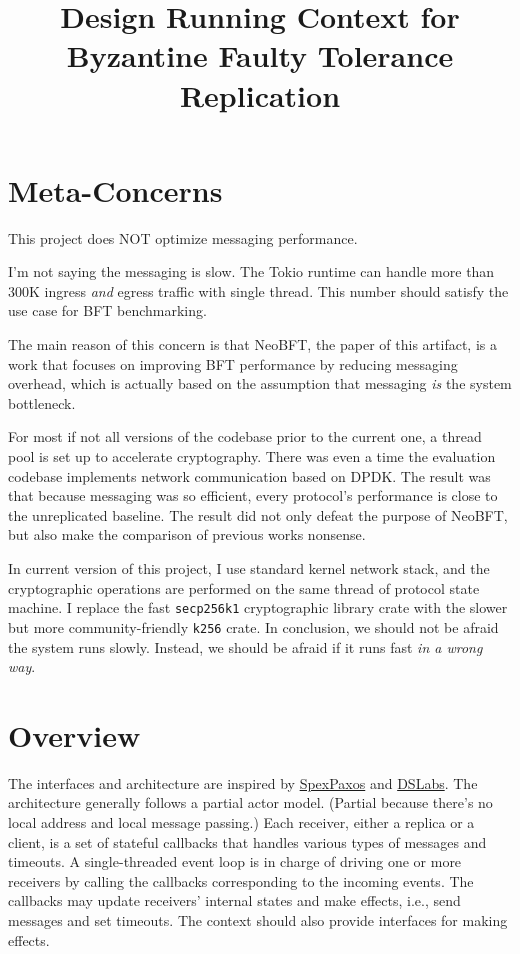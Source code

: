 \documentclass[acmsmall, nonacm, screen]{acmart}
\title{Design Running Context for Byzantine Faulty Tolerance Replication}
\begin{document}
\maketitle

\section{Meta-Concerns}

This project does NOT optimize messaging performance.

I'm not saying the messaging is slow.
The Tokio runtime can handle more than 300K ingress \emph{and} egress traffic with single thread.
This number should satisfy the use case for BFT benchmarking.

The main reason of this concern is that NeoBFT, the paper of this artifact, is a work that focuses on improving BFT performance by reducing messaging overhead, which is actually based on the assumption that messaging \emph{is} the system bottleneck.

For most if not all versions of the codebase prior to the current one, a thread pool is set up to accelerate cryptography.
There was even a time the evaluation codebase implements network communication based on DPDK.
The result was that because messaging was so efficient, every protocol's performance is close to the unreplicated baseline.
The result did not only defeat the purpose of NeoBFT, but also make the comparison of previous works nonsense.

In current version of this project, I use standard kernel network stack, and the cryptographic operations are performed on the same thread of protocol state machine.
I replace the fast \texttt{secp256k1} cryptographic library crate with the slower but more community-friendly \texttt{k256} crate.
In conclusion, we should not be afraid the system runs slowly.
Instead, we should be afraid if it runs fast \emph{in a wrong way}.

\section{Overview}

The interfaces and architecture are inspired by \href{https://github.com/UWSysLab/specpaxos}{SpexPaxos} and \href{https://github.com/emichael/dslabs}{DSLabs}.
The architecture generally follows a partial actor model.
(Partial because there's no local address and local message passing.)
Each receiver, either a replica or a client, is a set of stateful callbacks that handles various types of messages and timeouts.
A single-threaded event loop is in charge of driving one or more receivers by calling the callbacks corresponding to the incoming events.
The callbacks may update receivers' internal states and make effects, i.e., send messages and set timeouts.
The context should also provide interfaces for making effects.
\end{document}
